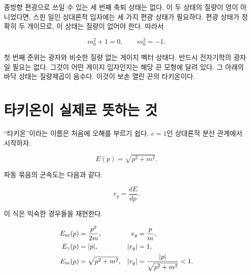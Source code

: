 종방향 편광으로 쓰일 수 있는 세 번째 축퇴 상태는 없다. 이 두 상태의 질량이 영이 아니었다면, 스핀 일인 상대론적 입자에는 세 가지 편광 상태가 필요하다. 편광 상태가 정확히 두 개이므로, 이 상태는 질량이 없어야 한다. 따라서

\begin{equation}
  m_0^2+1=0,
  \qquad
  m_0^2=-1.
  \label{eq:l03-intercept-condition}
\end{equation}

첫 번째 준위는 광자와 비슷한 질량 없는 게이지 벡터 상태다. 반드시 전자기학의 광자일 필요는 없다. 그것이 어떤 게이지 입자인지는 해당 끈 모형에 달려 있다. 그 아래의 바닥 상태는 질량제곱이 음수다. 이것이 보손 열린 끈의 타키온이다.

\begin{classroomqa}\end{classroomqa}

\section{타키온이 실제로 뜻하는 것}

``타키온''이라는 이름은 처음에 오해를 부르기 쉽다. \(c=1\)인 상대론적 분산 관계에서 시작하자.

\begin{equation}
  E(p)=\sqrt{p^2+m^2}.
  \label{eq:l03-relativistic-dispersion}
\end{equation}

파동 묶음의 군속도는 다음과 같다.

\begin{equation}
  v_g=\frac{dE}{dp}.
  \label{eq:l03-group-velocity}
\end{equation}

이 식은 익숙한 경우들을 재현한다.

\begin{align}
  E_{\rm nr}(p)&=\frac{p^2}{2m},
  &v_g&=\frac{p}{m},
  \label{eq:l03-nr-group-velocity}\\
  E_\gamma(p)&=|p|,
  &|v_g|&=1,
  \label{eq:l03-photon-group-velocity}\\
  E_m(p)&=\sqrt{p^2+m^2},
  &|v_g|&=\frac{|p|}{\sqrt{p^2+m^2}}<1.
  \label{eq:l03-massive-group-velocity}
\end{align}

